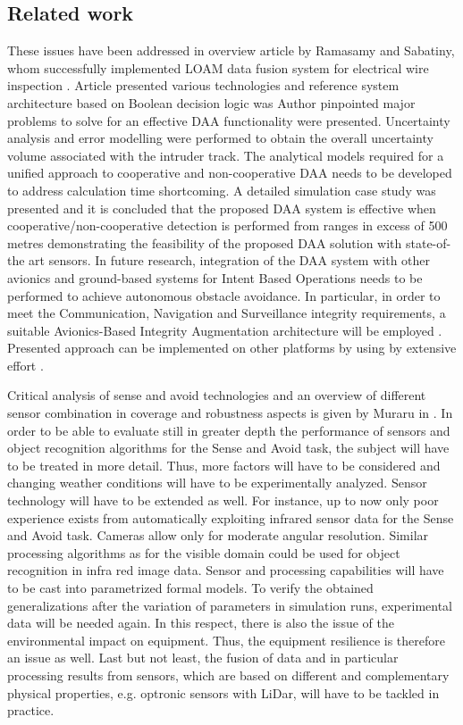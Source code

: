 \subsection{Related work}
These issues have been addressed in overview article by Ramasamy and Sabatiny, whom successfully implemented LOAM data fusion system for electrical wire inspection \cite{ramasamy2014avionics}. Article presented various technologies and  reference system architecture based on Boolean decision logic was Author pinpointed major problems to solve for an effective DAA functionality were presented.  Uncertainty analysis and error modelling were performed to obtain the overall uncertainty volume associated with the intruder track. 
The analytical models required for a unified approach to cooperative and non-cooperative DAA needs to be developed to address calculation time shortcoming. A detailed simulation case study was presented and it is concluded that the proposed DAA system is effective when cooperative/non-cooperative detection is performed from ranges in excess of 500 metres demonstrating the feasibility of the proposed DAA solution with state-of-the art  sensors. In future research, integration of the DAA system with other avionics and ground-based systems for Intent Based Operations \cite{gardi20134,ramasamy2013novel} needs to be performed to achieve autonomous obstacle avoidance. In particular, in order to meet the Communication, Navigation and Surveillance integrity requirements, a suitable Avionics-Based Integrity Augmentation architecture will be employed \cite{sabatini2013novel,gardi2014real}. Presented approach can be implemented on other platforms by using by extensive effort \cite{burston2014reverse}.  


Critical analysis of sense and avoid technologies and an overview of different sensor combination in coverage and robustness aspects is given by Muraru in \cite{muraru2011critical}.
In order to be able to evaluate still in greater depth the performance of sensors and object recognition algorithms for the Sense and Avoid task, the subject will have to be treated in more detail. Thus, more factors will have to be considered and changing weather conditions will have to be experimentally analyzed. Sensor technology will have to be extended as well. For instance, up to now only poor experience exists from automatically exploiting infrared sensor data for the Sense and Avoid task. Cameras allow only for moderate angular resolution. Similar processing algorithms as for the visible domain could be used for object recognition in infra red image data. Sensor and processing capabilities will have to be cast into parametrized formal models. To verify the obtained generalizations after the variation of parameters in simulation runs, experimental data will be needed again. In this respect, there is also the issue of the environmental impact on equipment. Thus, the equipment resilience is therefore an issue as well. Last but not least, the fusion of data and in particular processing results from sensors, which are based on different and complementary physical properties, e.g. optronic sensors with LiDar, will have to be tackled in practice. 


